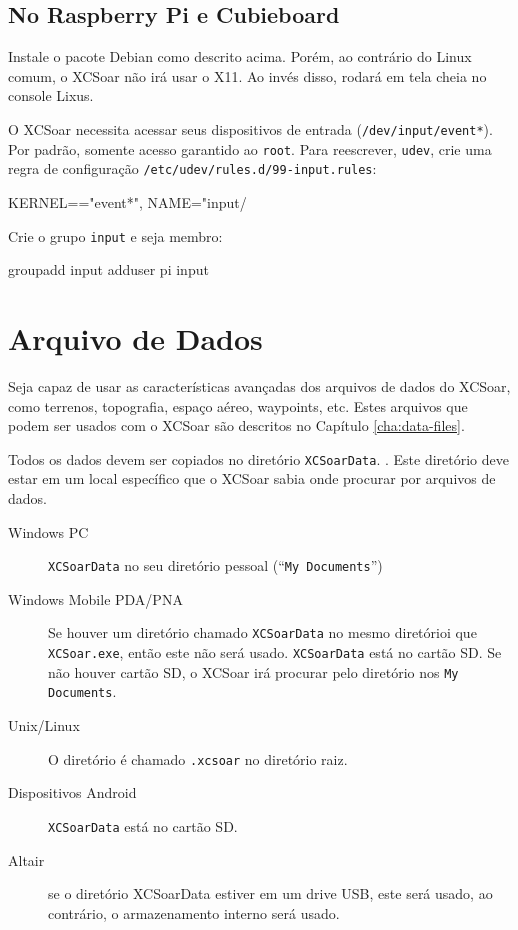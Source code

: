 \subsection*{No Raspberry Pi e Cubieboard}

Instale o pacote Debian como descrito acima.  Porém, ao contrário do Linux comum, o XCSoar não irá usar o X11.  Ao invés disso, rodará em tela cheia no console Lixus.

O XCSoar necessita acessar seus dispositivos de entrada
(\texttt{/dev/input/event*}).  Por padrão, somente acesso garantido ao \texttt{root}.  Para reescrever,  \texttt{udev}, crie uma regra de configuração \texttt{/etc/udev/rules.d/99-input.rules}:

\begin{verbatim*}
KERNEL=="event*", NAME="input/%k", MODE="660", GROUP="input"
\end{verbatim*}

Crie o grupo \texttt{input} e seja membro:

\begin{verbatim*}
groupadd input
adduser pi input
\end{verbatim*}

\section{Arquivo de Dados}\label{sec:data files}

Seja capaz de usar as características avançadas dos arquivos de dados do XCSoar, como terrenos, topografia, espaço aéreo, waypoints, etc.  
Estes arquivos que podem ser usados com o XCSoar são descritos no Capítulo
\ref{cha:data-files}.

Todos os dados devem ser copiados no diretório 
\texttt{XCSoarData}.  .  Este diretório deve estar em um local específico que o XCSoar sabia onde procurar por arquivos de dados.

\begin{description}
\item[Windows PC]
\texttt{XCSoarData} no seu diretório pessoal (``\texttt{My
Documents}'')
\item[Windows Mobile PDA/PNA]
Se houver um diretório chamado \texttt{XCSoarData} no mesmo diretórioi que \texttt{XCSoar.exe}, então este não será usado.
\texttt{XCSoarData} está no cartão SD.  Se não houver cartão SD, o XCSoar irá procurar pelo diretório nos \texttt{My Documents}.
\item[Unix/Linux]
O diretório é chamado \verb|.xcsoar| no diretório raiz.
\item[Dispositivos Android]
\texttt{XCSoarData} está no cartão SD.
\item[Altair]
se o diretório XCSoarData estiver em um drive USB, este será usado, ao contrário, o armazenamento interno será usado.
\end{description}


